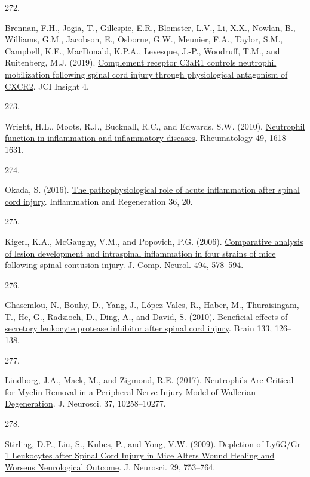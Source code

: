 \documentclass[
]{article}
\newlength{\cslhangindent}
\newlength{\csllabelwidth}
\newlength{\cslentryspacingunit} %
\newenvironment{CSLReferences}[2] %
 {%
  \setlength{\parindent}{0pt}
  \ifodd #1
  \let\oldpar\par
  \def\par{\hangindent=\cslhangindent\oldpar}
  \fi
  \setlength{\parskip}{#2\cslentryspacingunit}
 }%
 {}
\newcommand{\CSLLeftMargin}[1]{\parbox[t]{\csllabelwidth}{#1}}
\newcommand{\CSLRightInline}[1]{\parbox[t]{\linewidth - \csllabelwidth}{#1}\break}
\begin{document}
\begin{CSLReferences}{0}{0}
\leavevmode{}%
\CSLLeftMargin{272. }
\CSLRightInline{Brennan, F.H., Jogia, T., Gillespie, E.R., Blomster, L.V., Li, X.X., Nowlan, B., Williams, G.M., Jacobson, E., Osborne, G.W., Meunier, F.A., Taylor, S.M., Campbell, K.E., MacDonald, K.P.A., Levesque, J.-P., Woodruff, T.M., and Ruitenberg, M.J. (2019). \href{https://doi.org/10.1172/jci.insight.98254}{Complement receptor {C3aR1} controls neutrophil mobilization following spinal cord injury through physiological antagonism of {CXCR2}}. JCI Insight 4.}

\leavevmode{}%
\CSLLeftMargin{273. }
\CSLRightInline{Wright, H.L., Moots, R.J., Bucknall, R.C., and Edwards, S.W. (2010). \href{https://doi.org/10.1093/rheumatology/keq045}{Neutrophil function in inflammation and inflammatory diseases}. Rheumatology 49, 1618--1631.}

\leavevmode{}%
\CSLLeftMargin{274. }
\CSLRightInline{Okada, S. (2016). \href{https://doi.org/10.1186/s41232-016-0026-1}{The pathophysiological role of acute inflammation after spinal cord injury}. Inflammation and Regeneration 36, 20.}

\leavevmode{}%
\CSLLeftMargin{275. }
\CSLRightInline{Kigerl, K.A., McGaughy, V.M., and Popovich, P.G. (2006). \href{https://doi.org/10.1002/cne.20827}{Comparative analysis of lesion development and intraspinal inflammation in four strains of mice following spinal contusion injury}. J. Comp. Neurol. 494, 578--594.}

\leavevmode{}%
\CSLLeftMargin{276. }
\CSLRightInline{Ghasemlou, N., Bouhy, D., Yang, J., López-Vales, R., Haber, M., Thuraisingam, T., He, G., Radzioch, D., Ding, A., and David, S. (2010). \href{https://doi.org/10.1093/brain/awp304}{Beneficial effects of secretory leukocyte protease inhibitor after spinal cord injury}. Brain 133, 126--138.}

\leavevmode{}%
\CSLLeftMargin{277. }
\CSLRightInline{Lindborg, J.A., Mack, M., and Zigmond, R.E. (2017). \href{https://doi.org/10.1523/JNEUROSCI.2085-17.2017}{Neutrophils {Are Critical} for {Myelin Removal} in a {Peripheral Nerve Injury Model} of {Wallerian Degeneration}}. J. Neurosci. 37, 10258--10277.}

\leavevmode{}%
\CSLLeftMargin{278. }
\CSLRightInline{Stirling, D.P., Liu, S., Kubes, P., and Yong, V.W. (2009). \href{https://doi.org/10.1523/JNEUROSCI.4918-08.2009}{Depletion of {Ly6G}/{Gr-1 Leukocytes} after {Spinal Cord Injury} in {Mice Alters Wound Healing} and {Worsens Neurological Outcome}}. J. Neurosci. 29, 753--764.}


\end{CSLReferences}
\end{document}
